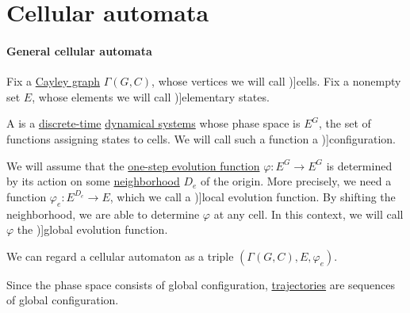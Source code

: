 \section{Cellular automata}\label{sec:cellular_automata}

\paragraph{General cellular automata}

\begin{definition}\label{def:cellular_automaton}
  Fix a \hyperref[def:cayley_graph]{Cayley graph} \( \Gamma(G, C) \), whose vertices we will call \term[en=cell (\cite[def. 2.1.3]{HadelerMüller2017CellularAutomata})]{cells}. Fix a nonempty set \( E \), whose elements we will call \term[en=elementary state (\cite[def. 2.3.1]{HadelerMüller2017CellularAutomata})]{elementary states}.

  A  is a \hyperref[def:discrete_dynamical_system]{discrete-time} \hyperref[def:dynamical_system]{dynamical systems} whose phase space is \( E^G \), the set of functions assigning states to cells. We will call such a function a \term[en=configuration (\cite[def. 2.3.2]{HadelerMüller2017CellularAutomata})]{configuration}.

  We will assume that the \hyperref[def:one_step_evolution_function]{one-step evolution function} \( \varphi: E^G \to E^G \) is determined by its action on some \hyperref[def:cayley_graph_neighborhood]{neighborhood} \( D_e \) of the origin. More precisely, we need a function \( \varphi_e: E^{D_e} \to E \), which we call a \term[en=local function (\cite[def. 2.4.1]{HadelerMüller2017CellularAutomata})]{local evolution function}. By shifting the neighborhood, we are able to determine \( \varphi \) at any cell. In this context, we will call \( \varphi \) the \term[en=global function (\cite[def. 2.4.1]{HadelerMüller2017CellularAutomata})]{global evolution function}.
\end{definition}
\begin{comments}
  \item We can regard a cellular automaton as a triple \( (\Gamma(G, C), E, \varphi_e) \).
  \item Since the phase space consists of global configuration, \hyperref[def:dynamical_system_trajectory]{trajectories} are sequences of global configuration.
\end{comments}

